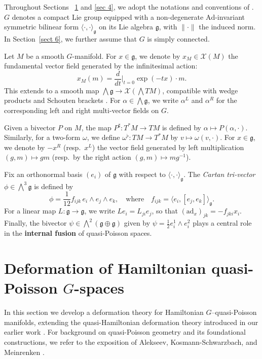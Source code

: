 \documentclass[reqno]{amsart}
\theoremstyle{plain}
\theoremstyle{definition}
\begin{document}
Throughout Sections ~\ref{sec 2} and \ref{sec 4}, we adopt the notations and conventions of \cite{alekseev2002quasi}. $G$ denotes a compact Lie group equipped with a non-degenerate $\mathrm{Ad}$-invariant symmetric bilinear form $\langle \cdot, \cdot\rangle_{\mathfrak{g}}$ on its Lie algebra $\mathfrak{g}$, with $\|\cdot\|$ the induced norm. In Section~\ref{sect 6}, we further assume that $G$ is simply connected.

Let $M$ be a smooth $G$-manifold. For $x \in \mathfrak{g}$, we denote by $x_{M} \in \mathcal{X}(M)$ the fundamental vector field generated by the infinitesimal action:
\[
x_{M}(m) = \frac{d}{dt}\Big|_{t=0}\exp(-tx)\cdot m.
\]
This extends to a smooth map $\bigwedge \mathfrak{g} \to \mathcal{X}(\bigwedge TM)$, compatible with wedge products and Schouten brackets \cite[Section~1]{alekseev2002quasi}. For $\alpha \in \bigwedge \mathfrak{g}$, we write $\alpha^L$ and $\alpha^R$ for the corresponding left and right multi-vector fields on $G$.

Given a bivector $P$ on $M$, the map $P^{\sharp}: T^{*}M \to TM$ is defined by $\alpha \mapsto P(\alpha,\cdot)$. Similarly, for a two-form $\omega$, we define $\omega^{\flat}: TM \to T^{*}M$ by $v \mapsto \omega(v,\cdot)$. For $x \in \mathfrak{g}$, we denote by $-x^{R}$ (resp.\ $x^{L}$) the vector field generated by left multiplication $(g,m) \mapsto gm$ (resp.\ by the right action $(g,m) \mapsto mg^{-1}$).

Fix an orthonormal basis $(e_{i})$ of $\mathfrak{g}$ with respect to $\langle\cdot,\cdot\rangle_{\mathfrak{g}}$. The \emph{Cartan tri-vector} $\phi \in \bigwedge^3 \mathfrak{g}$ is defined by
\[
\phi = \frac{1}{12} f_{ijk}\, e_{i}\wedge e_{j}\wedge e_{k}, \quad \text{where} \quad f_{ijk} = \langle e_{i}, [e_{j},e_{k}] \rangle_{\mathfrak{g}}.
\]
For a linear map $L: \mathfrak{g} \to \mathfrak{g}$, we write $Le_{i} = L_{ji}e_{j}$, so that $(\mathrm{ad}_{x})_{jk} = -f_{jki}x_{i}$. Finally, the bivector $\psi \in \bigwedge^{2}(\mathfrak{g} \oplus \mathfrak{g})$ given by $\psi = \frac{1}{2}e_{i}^{1}\wedge e_{i}^{2}$ plays a central role in the \textbf{internal fusion} of quasi-Poisson spaces.





\section{Deformation of Hamiltonian quasi-Poisson $G$-spaces} \label{sec 2}
In this section we develop a deformation theory for Hamiltonian $G${--}quasi-Poisson manifolds, extending the quasi-Hamiltonian deformation theory introduced in our earlier work \cite{JMM2025deformations}. For background on quasi-Poisson geometry and its foundational constructions, we refer to the exposition of Alekseev, Kosmann-Schwarzbach, and Meinrenken \cite{alekseev2002quasi}.
\end{document}
